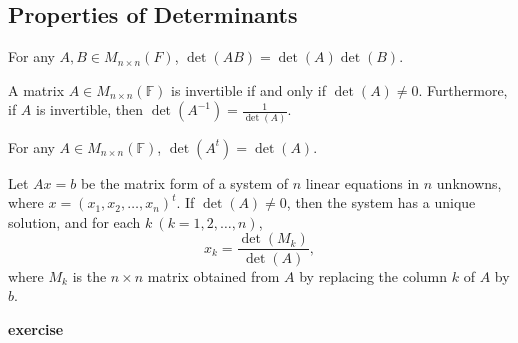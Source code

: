 \subsection{Properties of Determinants}
\begin{theorem}
    For any \(A,B \in M_{n \times n}(F)\), \( \det (AB) = \det (A) \det (B) \).
\end{theorem}
\newpage
\begin{corollary}
    A matrix \(A \in M_{n \times n}(\mathbb{F})\) is invertible if and only if \(\det (A) \neq 0\).
    Furthermore, if \(A\) is invertible, then \(\det (A^{-1}) = \frac{1}{\det (A)}\).
\end{corollary}
\vspace{3cm}
\begin{theorem}
    For any \(A \in M_{n \times n}(\mathbb{F})\), \(\det (A^t) = \det (A)\).
\end{theorem}
\vspace{5cm}
\begin{theorem}
    Let \( Ax = b\) be the matrix form of a system of \( n\) linear equations in \( n \) unknowns, where \( x = (x_1, x_2, \dots , x_n)^t \).
    If \(\det (A) \neq 0\), then the system has a unique solution, and for each \(k\ (k = 1, 2, \dots , n)\),
    \[
    x_k = \frac{\det (M_k)}{\det (A)},
    \]
    where \(M_k\) is the \(n \times n \) matrix obtained from \(A\) by replacing the column \(k\) of \(A\) by \(b\).
\end{theorem}
\vspace{5cm}
\textbf{exercise}
